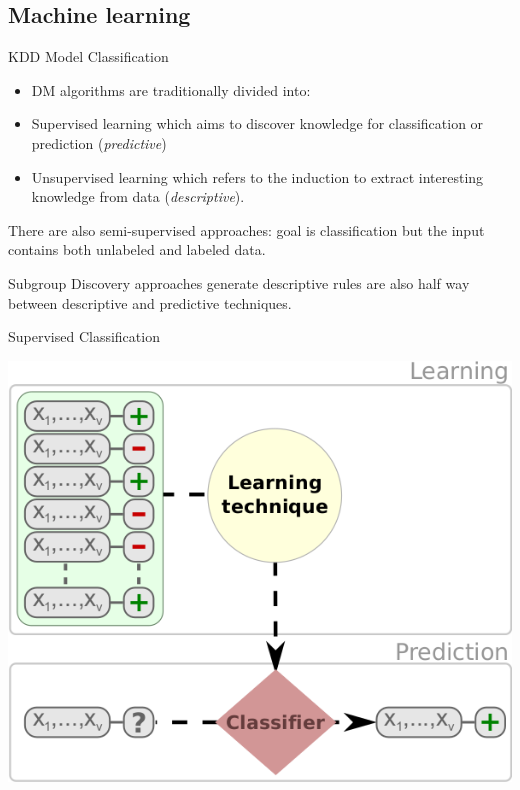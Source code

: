 \documentclass{beamer}
\begin{document}
\subsection{Machine learning}

\begin{frame}{KDD Model Classification}

\begin{itemize}
 \item DM algorithms are traditionally divided into:
 \item \alert{Supervised learning} which aims to discover knowledge for classification or prediction (\emph{predictive})
 \item \alert{Unsupervised learning} which refers to the induction to extract interesting knowledge from data (\emph{descriptive}).

\end{itemize}

There are also semi-supervised approaches: goal is classification but the input contains both unlabeled and labeled data.

Subgroup Discovery approaches generate descriptive rules are also half way between descriptive and predictive techniques.

\end{frame}

\begin{frame}{Supervised Classification}

\begin{center}
\includegraphics[width=.6\textwidth]{figs/supervisedClassification}
\end{center}

\end{frame}
\end{document}
